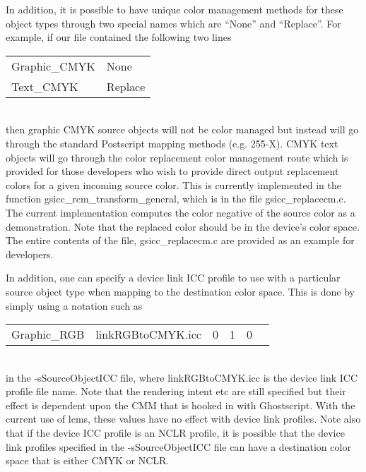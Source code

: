 \documentclass[12pt,notitlepage]{article}
\begin{document}
In addition, it is possible to have unique color management methods for these object types through two special names which are ``None'' and ``Replace''.   For example, if our file contained the following two lines\\

\begin{tabular}{ll}
Graphic\_CMYK & None \\
Text\_CMYK	& Replace  \\
\end{tabular}\\

\noindent then graphic CMYK source objects will not be color managed but instead will go through the standard Postscript mapping methods (e.g. 255-X).   CMYK text objects will go through the color replacement color management route which is provided for those developers who wish to provide direct output replacement colors for a given incoming source color.  This is currently implemented in the function gsicc\_rcm\_transform\_general, which is in the file gsicc\_replacecm.c.  The current implementation computes the color negative of the source color as a demonstration.  Note that the replaced color should be in the device's color space.   The entire contents of the file, gsicc\_replacecm.c are provided as an example for developers.

In addition, one can specify a device link ICC profile to use with a particular source object type when mapping to the destination color space.  This is done by simply using a notation such as\\

\begin{tabular}{llllll}
Graphic\_RGB &	linkRGBtoCMYK.icc	& 0 & 1 & 0 & \\
\end{tabular}\\

\noindent in the -sSourceObjectICC file, where linkRGBtoCMYK.icc is the device link ICC profile file name.  Note that the rendering intent etc are still specified but their effect is dependent upon the CMM that is hooked in with Ghostscript.  With the current use of lcms, these values have no effect with device link profiles.   Note also that if the device ICC profile is an NCLR profile, it is possible that the device link profiles specified in the -sSourceObjectICC file can have a destination color space that is either CMYK or NCLR.
\end{document}
